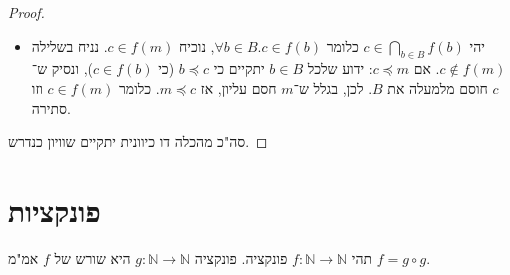 \documentclass[]{article}
\newcommand\N     {\mathbb{N}}
\begin{document}
\begin{enumerate}[(a)]
\begin{proof}
\begin{itemize}
				\item יהי $c \in \bigcap_{b \in B}f(b)$ כלומר $\forall b \in B. c \in f(b)$, נוכיח $c \in f(m)$. נניח בשלילה $c \notin f(m)$. אם $c \preceq m$: ידוע שלכל $b \in B$ יתקיים כי $b \preceq c$ (כי $c \in f(b)$), ונסיק ש־$c$ חוסם מלמעלה את $B$. לכן, בגלל ש־$m$ חסם עליון, אז $m \preceq c$. כלומר $c \in f(m)$ וזו סתירה. 
			\end{itemize}
			סה"כ מהכלה דו כיוונית יתקיים שוויון כנדרש. 
		\end{proof}
		
		\end{enumerate}
	
	\pagebreak
	\section{פונקציות}
	תהי $f \colon \N \to \N$ פונקציה. פונקציה $g \colon \N \to \N$ היא שורש של $f$ אמ"מ $f = g \circ g$. 
\end{document}
